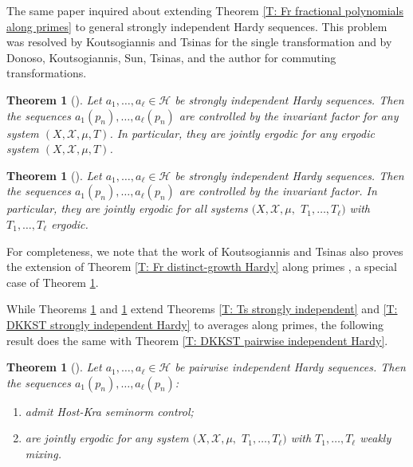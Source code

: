 \documentclass[11pt]{amsart}
\newtheorem{theorem}[lemma]{Theorem}
\theoremstyle{definition}
\newcommand{\CH}{{\mathcal H}}
\newcommand{\CX}{{\mathcal X}}
\newcommand{\1}{{\mathbf{1}}}
\begin{document}
    The same paper inquired about extending Theorem \ref{T: Fr fractional polynomials along primes} to general strongly independent Hardy sequences. This problem was resolved by Koutsogiannis and Tsinas \cite{KoTs23} for the single transformation and by Donoso, Koutsogiannis, Sun, Tsinas, and the author \cite{DKKST24} for commuting transformations.
    \begin{theorem}%
    [{\cite[Theorem 1.4]{KoTs23}}]\label{T: KoTs strongly independent along primes}
        Let $a_1, \ldots, a_\ell\in \CH$ be  strongly independent Hardy sequences.     Then the sequences $a_1(p_n), \ldots, a_\ell(p_n)$ are controlled by the invariant factor for any system $(X, \CX, \mu, T)$. In particular, they are jointly ergodic for any ergodic system $(X, \CX, \mu, T)$.
    \end{theorem}
    \begin{theorem}%
    [{\cite[Theorem 1.12(i)]{DKKST24}}]\label{T: DKKST strongly independent along primes}
        Let $a_1, \ldots, a_\ell\in \CH$ be  strongly independent Hardy sequences. Then the sequences $a_1(p_n), \ldots, a_\ell(p_n)$ are controlled by the invariant factor. In particular, they are jointly ergodic for all systems $(X, \CX, \mu,$\! $T_1, \ldots, T_\ell)$ with $T_1, \ldots, T_\ell$ ergodic.  
    \end{theorem}
    For completeness, we note that the work of Koutsogiannis and Tsinas also proves the extension of Theorem \ref{T: Fr distinct-growth Hardy} along primes \cite[Theorem 1.5]{KoTs23}, a special case of Theorem \ref{T: DKKST strongly independent along primes}.

    While Theorems \ref{T: KoTs strongly independent along primes} and \ref{T: DKKST strongly independent along primes} extend Theorems \ref{T: Ts strongly independent} and \ref{T: DKKST strongly independent Hardy} to averages along primes, the following result does the same with Theorem \ref{T: DKKST pairwise independent Hardy}.
    \begin{theorem}%
    [{\cite[Theorem 1.12(ii)]{DKKST24}}]\label{T: DKKST pairwise independent Hardy along primes}
    Let $a_1, \ldots, a_\ell\in \CH$ be pairwise independent Hardy sequences. Then the sequences $a_1(p_n), \ldots, a_\ell(p_n)$:
    \begin{enumerate}
        \item admit Host-Kra seminorm control;
        \item are jointly ergodic for any system $(X, \CX, \mu,$\! $T_1, \ldots, T_\ell)$ with $T_1, \ldots, T_\ell$ weakly mixing.
    \end{enumerate}    
    \end{theorem}
\end{document}
